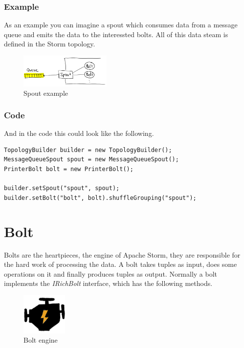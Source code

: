 \subsubsection{Example}
As an example you can imagine a spout which consumes data from a message queue and emits the data
to the interessted bolts. All of this data steam is defined in the Storm topology.

\begin{figure}[H]
\centering
\captionsetup{justification=centering}
\includegraphics[width=0.4\textwidth]{images/spout_example.png}
\caption[Spout example]{Spout example}
\end{figure}

\subsubsection{Code}
And in the code this could look like the following.
\begin{lstlisting}
TopologyBuilder builder = new TopologyBuilder();
MessageQueueSpout spout = new MessageQueueSpout();
PrinterBolt bolt = new PrinterBolt();

builder.setSpout("spout", spout);
builder.setBolt("bolt", bolt).shuffleGrouping("spout");
\end{lstlisting}


\newpage

\section{Bolt}
Bolts are the heartpieces, the engine of Apache Storm, they are responsible for the hard work of processing the data.
A bolt takes tuples as input, does some operations on it and finally produces tuples as output.
Normally a bolt implements the \textit{IRichBolt} interface, which has the following methods.

\begin{figure}[H]
\centering
\captionsetup{justification=centering}
\includegraphics[width=0.2\textwidth]{images/engine.png}
\caption[Bolt engine]{Bolt engine}
\end{figure}

